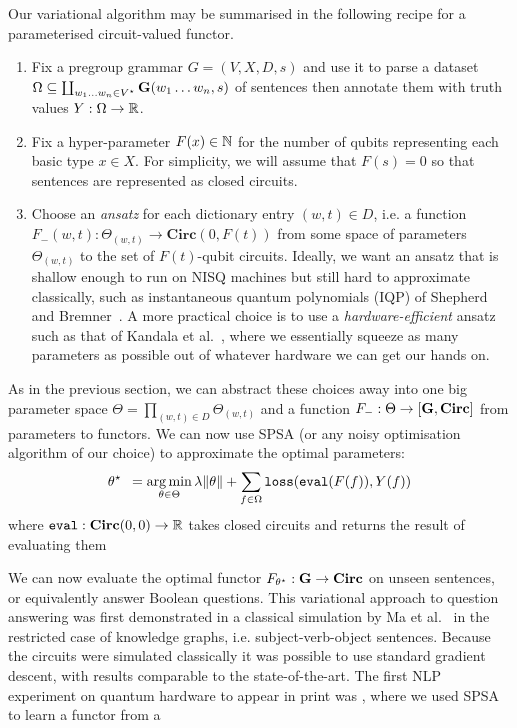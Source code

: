 Our variational algorithm may be summarised in the following recipe for a parameterised circuit-valued functor.
\begin{enumerate}
\item Fix a pregroup grammar $G = (V, X, D, s)$ and use it to parse a dataset $\Omega \subseteq \coprod_{w_1 \dots w_n \in V^\star} \mathbf{G}(w_1 \dots w_n, s)$ of sentences then annotate them with truth values $Y : \Omega \to \mathbb{R}$.
\item Fix a hyper-parameter $F(x) \in \mathbb{N}$ for the number of qubits representing each basic type $x \in X$.
For simplicity, we will assume that $F(s) = 0$ so that sentences are represented as closed circuits.
\item Choose an \emph{ansatz} for each dictionary entry $(w, t) \in D$, i.e. a function $F_-(w, t) : \Theta_{(w, t)} \to \mathbf{Circ}(0, F(t))$ from some space of parameters $\Theta_{(w, t)}$ to the set of $F(t)$-qubit circuits.
Ideally, we want an ansatz that is shallow enough to run on NISQ machines but still hard to approximate classically, such as instantaneous quantum polynomials (IQP) of Shepherd and Bremner~\cite{ShepherdBremner09}.
A more practical choice is to use a \emph{hardware-efficient} ansatz such as that of Kandala et al.~\cite{KandalaEtAl17}, where we essentially squeeze as many parameters as possible out of whatever hardware we can get our hands on.
\end{enumerate}
As in the previous section, we can abstract these choices away into one big parameter space $\Theta = \prod_{(w, t) \in D} \Theta_{(w, t)}$ and a function $F_- : \Theta \to [\mathbf{G}, \mathbf{Circ}]$ from parameters to functors.
We can now use SPSA (or any noisy optimisation algorithm of our choice) to approximate the optimal parameters:
$$\theta^\star \enspace = \operatorname*{arg\,min}_{\theta \in \Theta}
\lambda \lVert \theta \rVert + \sum_{f \in \Omega} \mathtt{loss}(\mathtt{eval}(F(f)), Y(f))$$
where $\mathtt{eval} : \mathbf{Circ}(0, 0) \to \mathbb{R}$ takes closed circuits and returns the result of evaluating them

We can now evaluate the optimal functor $F_{\theta^\star} : \mathbf{G} \to \mathbf{Circ}$ on unseen sentences, or equivalently answer Boolean questions.
This variational approach to question answering was first demonstrated in a classical simulation by Ma et al.~\cite{MaEtAl19} in the restricted case of knowledge graphs, i.e. subject-verb-object sentences.
Because the circuits were simulated classically it was possible to use standard gradient descent, with results comparable to the state-of-the-art.
The first NLP experiment on quantum hardware to appear in print was \cite{MeichanetzidisEtAl20}, where we used SPSA to learn a functor from a 

